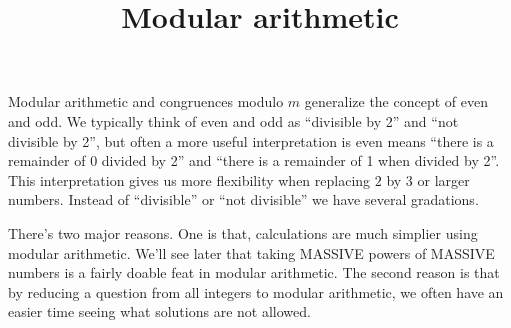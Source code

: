 \documentclass{ximera}
\title{Modular arithmetic}
\begin{document}
\begin{abstract}
\end{abstract}
\maketitle


Modular arithmetic and congruences modulo $m$ generalize the concept of even and odd. We typically think of even and odd as ``divisible by 2'' and ``not divisible by 2'', but often a more useful interpretation is even means ``there is a remainder of $0$ divided by 2'' and ``there is a remainder of 1 when divided by 2''.
This interpretation gives us more flexibility when replacing $2$ by $3$ or larger numbers. Instead of ``divisible'' or ``not divisible'' we have several gradations.

There's two major reasons. One is that, calculations are much simplier using modular arithmetic. We'll see later that taking MASSIVE powers of MASSIVE numbers is a fairly doable feat in modular arithmetic. The second reason is that by reducing a question from all integers to modular arithmetic, we often have an easier time seeing what solutions are not allowed. 
\end{document}
